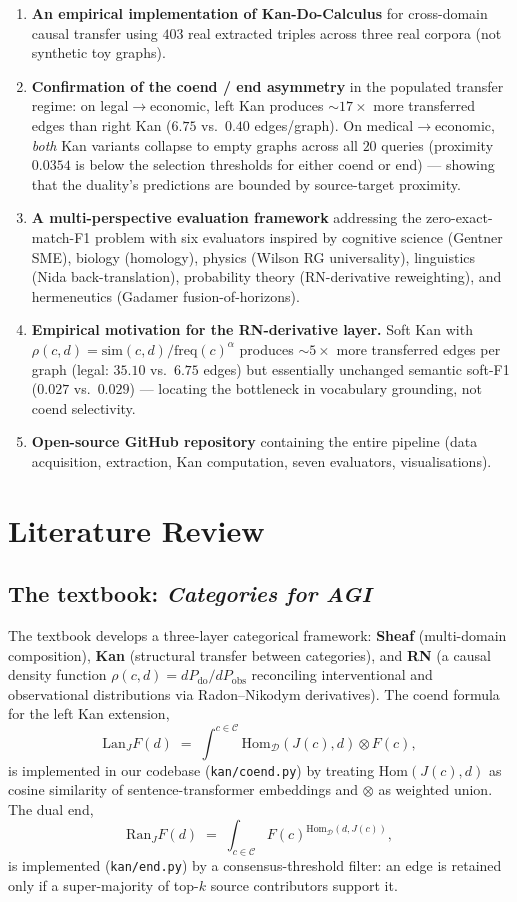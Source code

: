 \documentclass[10pt,letterpaper]{article}
\begin{document}
\begin{enumerate}
\item \textbf{An empirical implementation of Kan-Do-Calculus} for cross-domain causal transfer using $403$ real extracted triples across three real corpora (not synthetic toy graphs).
\item \textbf{Confirmation of the coend / end asymmetry} in the populated transfer regime: on legal${\to}$economic, left Kan produces ${\sim}17{\times}$ more transferred edges than right Kan ($6.75$ vs.\ $0.40$ edges/graph). On medical${\to}$economic, \emph{both} Kan variants collapse to empty graphs across all $20$ queries (proximity $0.0354$ is below the selection thresholds for either coend or end) --- showing that the duality's predictions are bounded by source-target proximity.
\item \textbf{A multi-perspective evaluation framework} addressing the zero-exact-match-F1 problem with six evaluators inspired by cognitive science (Gentner SME), biology (homology), physics (Wilson RG universality), linguistics (Nida back-translation), probability theory (RN-derivative reweighting), and hermeneutics (Gadamer fusion-of-horizons).
\item \textbf{Empirical motivation for the RN-derivative layer.} Soft Kan with $\rho(c,d) = \mathrm{sim}(c,d)/\mathrm{freq}(c)^\alpha$ produces ${\sim}5{\times}$ more transferred edges per graph (legal: $35.10$ vs.\ $6.75$ edges) but essentially unchanged semantic soft-F1 ($0.027$ vs.\ $0.029$) --- locating the bottleneck in vocabulary grounding, not coend selectivity.
\item \textbf{Open-source GitHub repository} containing the entire pipeline (data acquisition, extraction, Kan computation, seven evaluators, visualisations).
\end{enumerate}

\section{Literature Review}

\subsection{The textbook: \emph{Categories for AGI}~\cite{catagi}}

The textbook develops a three-layer categorical framework: \textbf{Sheaf} (multi-domain composition), \textbf{Kan} (structural transfer between categories), and \textbf{RN} (a causal density function $\rho(c,d) = dP_{\text{do}}/dP_{\text{obs}}$ reconciling interventional and observational distributions via Radon--Nikodym derivatives). The coend formula for the left Kan extension,
\[
\mathrm{Lan}_J F(d) \;=\; \int^{c \in \mathcal{C}} \mathrm{Hom}_{\mathcal{D}}(J(c), d) \otimes F(c),
\]
is implemented in our codebase (\texttt{kan/coend.py}) by treating $\mathrm{Hom}(J(c), d)$ as cosine similarity of sentence-transformer embeddings and $\otimes$ as weighted union. The dual end,
\[
\mathrm{Ran}_J F(d) \;=\; \int_{c \in \mathcal{C}} F(c)^{\mathrm{Hom}_{\mathcal{D}}(d, J(c))},
\]
is implemented (\texttt{kan/end.py}) by a consensus-threshold filter: an edge is retained only if a super-majority of top-$k$ source contributors support it.
\end{document}
